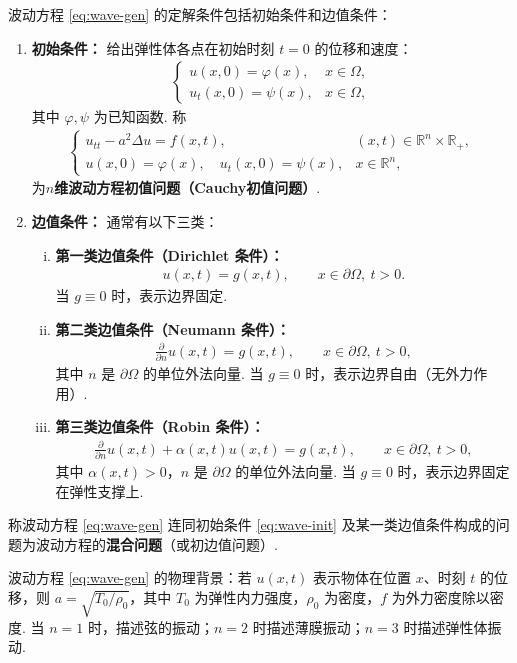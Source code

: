 \documentclass[../main.tex]{subfiles} %
\begin{document}
\begin{definition}[波动方程的定解条件]
波动方程 \eqref{eq:wave-gen} 的定解条件包括初始条件和边值条件：
\begin{enumerate}[(1)]
\item \textbf{初始条件：} 给出弹性体各点在初始时刻 $t=0$ 的位移和速度：
\begin{align}
\begin{cases}
u(x,0)=\varphi(x), & x\in\Omega, \\
u_t(x,0)=\psi(x), & x\in\Omega,
\end{cases} \label{eq:wave-init}
\end{align}
其中 $\varphi,\psi$ 为已知函数. 称
\begin{align}
\begin{cases}
u_{tt}-a^2\Delta u=f(x,t), & (x,t)\in\mathbb{R}^n\times\mathbb{R}_+,\\
u(x,0)=\varphi(x),\quad u_t(x,0)=\psi(x), & x\in\mathbb{R}^n,
\end{cases}
\end{align}
为\textbf{$n$维波动方程初值问题（Cauchy初值问题）}.

\item \textbf{边值条件：} 通常有以下三类：
\begin{enumerate}[(i)]
\item \textbf{第一类边值条件（Dirichlet 条件）：}
\begin{align}
u(x,t)=g(x,t),\qquad x\in\partial\Omega,\ t>0. \label{eq:wave-bc1}
\end{align}
当 $g\equiv 0$ 时，表示边界固定.

\item \textbf{第二类边值条件（Neumann 条件）：}
\begin{align}
\frac{\partial}{\partial n}u(x,t)=g(x,t),\qquad x\in\partial\Omega,\ t>0, \label{eq:wave-bc2}
\end{align}
其中 $n$ 是 $\partial\Omega$ 的单位外法向量. 当 $g\equiv 0$ 时，表示边界自由（无外力作用）.

\item \textbf{第三类边值条件（Robin 条件）：}
\begin{align}
\frac{\partial}{\partial n}u(x,t)+\alpha(x,t)u(x,t)=g(x,t),\qquad x\in\partial\Omega,\ t>0, \label{eq:wave-bc3}
\end{align}
其中 $\alpha(x,t)>0$，$n$ 是 $\partial\Omega$ 的单位外法向量. 当 $g\equiv 0$ 时，表示边界固定在弹性支撑上.
\end{enumerate}
\end{enumerate}
称波动方程 \eqref{eq:wave-gen} 连同初始条件 \eqref{eq:wave-init} 及某一类边值条件构成的问题为波动方程的\textbf{混合问题}（或初边值问题）.
\end{definition}
\begin{remark}
波动方程 \eqref{eq:wave-gen} 的物理背景：若 $u(x,t)$ 表示物体在位置 $x$、时刻 $t$ 的位移，则 $a=\sqrt{T_0/\rho_0}$，其中 $T_0$ 为弹性内力强度，$\rho_0$ 为密度，$f$ 为外力密度除以密度. 当 $n=1$ 时，描述弦的振动；$n=2$ 时描述薄膜振动；$n=3$ 时描述弹性体振动.
\end{remark}
\end{document}
